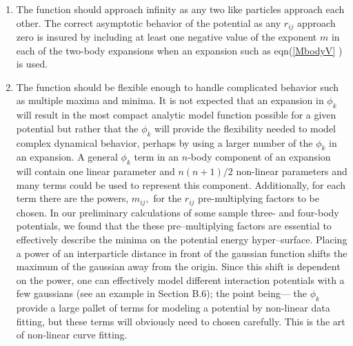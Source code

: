 \begin{enumerate}
\item  
The function should approach infinity as any two like particles
approach each other.
The correct asymptotic behavior of the potential as any $r_{ij}$ approach
zero is insured by including at least one negative value of the exponent $m$
in each of the two-body expansions when an expansion such as eqn(\ref{MbodyV}%
) is used. 


\item  
The function should be flexible enough to handle complicated behavior
such as multiple maxima and minima.
It is not expected that an expansion in $\phi _k$ will result in the most
compact analytic model function possible for a given potential but rather
that the $\phi _k$ will provide the flexibility needed to model complex
dynamical behavior, perhaps by using a larger 
number of the $\phi _k$ in an
expansion. A general $\phi _k$ term in an $n$-body component of an expansion
will contain one linear parameter and $n\left( n+1\right) /2$ non-linear
parameters and many terms could be used to represent this component.
Additionally, 
for each term there are the powers, $m_{ij},$ for the $r_{ij}$
pre-multiplying factors to be chosen. 
In our preliminary calculations of some sample three- and four-body
potentials, we found that the these pre--multiplying factors 
are essential to effectively describe the minima on the
potential energy hyper--surface.
Placing a power of an interparticle distance in front of the gaussian
function
shifts the maximum of the gaussian away from the origin.
Since this shift is dependent on the power, one can effectively 
model different interaction potentials with a few gaussians
(see an example in Section B.6);
the point being---
the $\phi _k$ provide a large pallet of terms for modeling a potential by
non-linear data fitting, but these terms will obviously need to chosen
carefully. This is the art of non-linear curve fitting. 





\end{enumerate}
